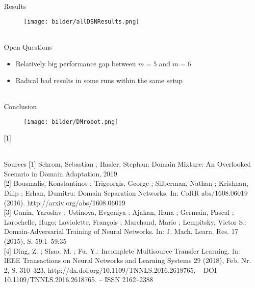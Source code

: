 \documentclass[accentcolor=tud4b,colorbacktitle,inverttitle,landscape,german,presentation,t]{tudbeamer}
\begin{document}
\begin{frame}{\\Results}
	\vspace{-0.6cm}
	\begin{figure}
		\centering
		\texttt{[image: bilder/allDSNResults.png]}
	\end{figure}
\end{frame}

\begin{frame}{\\Open Questions}
	\begin{itemize}
		\item<2-> Relatively big performance gap between $m = 5$ and $m = 6$
		\item<3-> Radical bad results in some runs within the same setup
	\end{itemize}
\end{frame}

\begin{frame}{\\Conclusion}
	\begin{center}
	\begin{figure}
		\centering
		\texttt{[image: bilder/DMrobot.png]}
	\end{figure}
	\tiny [1]
	\end{center}
\end{frame}

\begin{frame}{\\Sources}
	[1] Schrom, Sebastian ; Hasler, Stephan: Domain Mixture: An Overlooked Scenario in Domain Adaptation, 2019 \\ \vspace{0.2cm}
	{[2]} Bousmalis, Konstantinos ; Trigeorgis, George ; Silberman, Nathan ; Krishnan, Dilip ; Erhan, Dumitru: Domain Separation Networks. In: CoRR abs/1608.06019 (2016). http://arxiv.org/abs/1608.06019 \\ \vspace{0.2cm}
	{[3]} Ganin, Yaroslav ; Ustinova, Evgeniya ; Ajakan, Hana ; Germain, Pascal ; Larochelle, Hugo; Laviolette, François ; Marchand, Mario ; Lempitsky, Victor S.: Domain-Adversarial Training of Neural Networks. In: J. Mach. Learn. Res. 17 (2015), S. 59:1–59:35 \\\vspace{0.2cm}
	{[4]} Ding, Z. ; Shao, M. ; Fu, Y.: Incomplete Multisource Transfer Learning. In: IEEE Transactions on Neural Networks and Learning Systems 29 (2018), Feb, Nr. 2, S. 310–323. http://dx.doi.org/10.1109/TNNLS.2016.2618765. – DOI 10.1109/TNNLS.2016.2618765. – ISSN 2162–2388	\vspace{0.2cm}
\end{frame}
\end{document}
